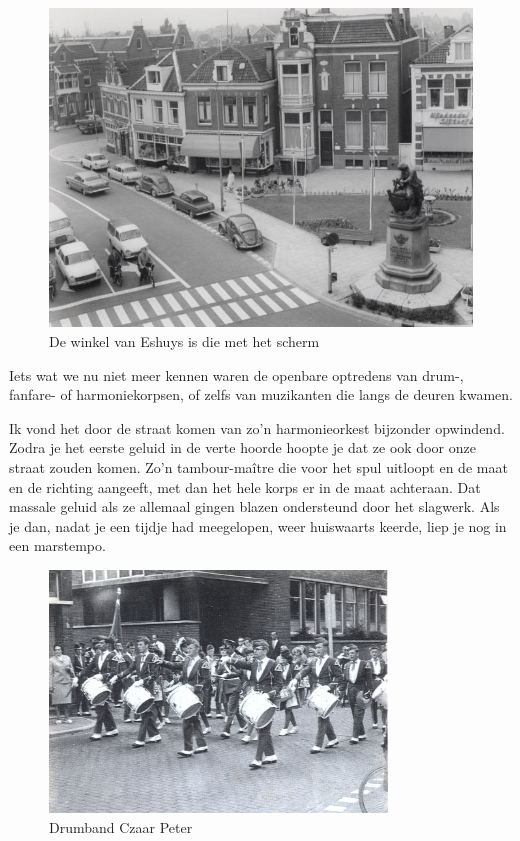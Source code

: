 \documentclass[12pt,twoside, openright]{memoir}
\begin{document}
\begin{figure}
\centering
\includegraphics[width=\textwidth]{img/ch23/Eshuijs}
\caption*{\footnotesize De winkel van Eshuys is die met het scherm}
\end{figure}

Iets wat we nu niet meer kennen waren de openbare optredens van drum-, fanfare- of harmoniekorpsen, of zelfs van muzikanten die langs de deuren kwamen. 

Ik vond het door de straat komen van zo’n harmonieorkest bijzonder opwindend. Zodra je het eerste geluid in de verte hoorde hoopte je dat ze ook door onze straat zouden komen. Zo’n tambour-maître die voor het spul uitloopt en de maat en de richting aangeeft, met dan het hele korps er in de maat achteraan. Dat massale geluid als ze allemaal gingen blazen ondersteund door het slagwerk. Als je dan, nadat je een tijdje had meegelopen, weer huiswaarts keerde, liep je nog in een marstempo.

\begin{figure}
\centering
\includegraphics[width=0.8\textwidth]{img/131CzPeter3.jpg}
\caption*{\footnotesize Drumband Czaar Peter}
\end{figure}
\end{document}
